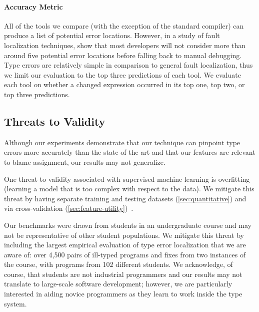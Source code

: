 

\paragraph{Accuracy Metric}
All of the tools we compare (with the exception of the standard \ocaml
compiler) can produce a list of potential error locations. 
%
However, in a study of fault localization techniques,
\citet{Kochhar2016-oc} show that most developers will not consider more
than around five potential error locations before falling back to manual
debugging.
%
Type errors are relatively simple in comparison to general fault
localization, thus we limit our evaluation to the top three predictions
of each tool.
%
We evaluate each tool on whether a changed expression occurred in its
top one, top two, or top three predictions.





\subsection{Threats to Validity} 

Although our experiments demonstrate that our technique can pinpoint type
errors more accurately than the state of the art and that our features are
relevant to blame assignment, our results may not generalize. 

One threat to validity associated with supervised machine learning is
overfitting (\ie learning a model that is too complex with respect to
the data).
%
We mitigate this threat by having separate training and testing datasets
(\autoref{sec:quantitative}) and via cross-validation
(\autoref{sec:feature-utility})~\cite{FIXME}.

Our benchmarks were drawn from students in an undergraduate course and
may not be representative of other student populations.
%
We mitigate this threat by including the largest empirical evaluation of
type error localization that we are aware of: over 4,500 pairs of
ill-typed programs and fixes from two instances of the course, with
programs from 102 different students.
%
We acknowledge, of course, that students are not industrial programmers
and our results may not translate to large-scale software development;
however, we are particularly interested in aiding novice programmers
as they learn to work inside the type system.

